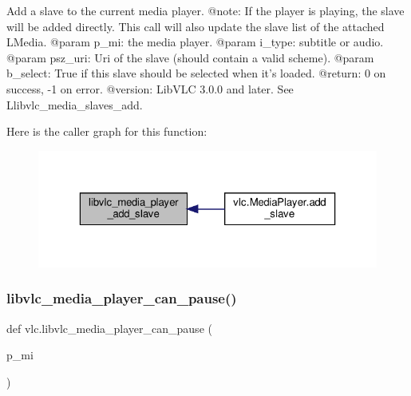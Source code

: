 \begin{DoxyVerb}Add a slave to the current media player.
@note: If the player is playing, the slave will be added directly. This call
will also update the slave list of the attached L{Media}.
@param p_mi: the media player.
@param i_type: subtitle or audio.
@param psz_uri: Uri of the slave (should contain a valid scheme).
@param b_select: True if this slave should be selected when it's loaded.
@return: 0 on success, -1 on error.
@version: LibVLC 3.0.0 and later. See L{libvlc_media_slaves_add}.
\end{DoxyVerb}
 Here is the caller graph for this function\+:
\nopagebreak
\begin{figure}[H]
\begin{center}
\leavevmode
\includegraphics[width=323pt]{namespacevlc_a1b31a681e5dab5d45ec9c0ed1badd839_icgraph}
\end{center}
\end{figure}
\mbox{\label{namespacevlc_a175c3b4575fc50df873cc8efaa052522}} 
\subsubsection{\texorpdfstring{libvlc\+\_\+media\+\_\+player\+\_\+can\+\_\+pause()}{libvlc\_media\_player\_can\_pause()}}
{\footnotesize\ttfamily def vlc.\+libvlc\+\_\+media\+\_\+player\+\_\+can\+\_\+pause (\begin{DoxyParamCaption}\item[{}]{p\+\_\+mi }\end{DoxyParamCaption})}

